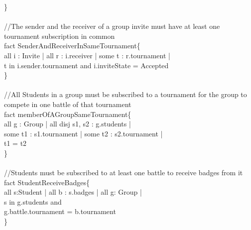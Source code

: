 \documentclass{article}
\begin{document}
{\}\\
\\
\color{gray}
//The sender and the receiver of a group invite must have at least one tournament subscription in common\\
\color{black}
\color{blue} fact \color{black} SenderAndReceiverInSameTournament\{\\
\-\hspace{1cm} \color{blue} all \color{black} i : Invite | \color{blue} all \color{black} r : i.receiver |  \color{blue} some \color{black} t : r.tournament | \\
\-\hspace{1cm} t \color{blue} in \color{black} i.sender.tournament \color{blue} and \color{black} i.inviteState = Accepted \\
\}\\
\\
\color{gray}
//All Students in a group must be subscribed to a tournament for the group to compete in one battle of that tournament\\%
\color{black}
\color{blue} fact \color{black} memberOfAGroupSameTournament\{\\
\-\hspace{1cm} \color{blue} all \color{black} g : Group | \color{blue} all disj \color{black} s1, s2 : g.students | \\
\-\hspace{1cm} \color{blue} some \color{black} t1 : s1.tournament | \color{blue} some \color{black} t2 : s2.tournament | \\
\-\hspace{1cm} t1 \color{blue} = \color{black} t2\\
\}\\
\\
\color{gray}
//Students must be subscribed to at least one battle to receive badges from it\\
\color{black}
\color{blue} fact \color{black} StudentReceiveBadges\{\\
\-\hspace{1cm} \color{blue} all \color{black} s:Student | \color{blue} all \color{black} b : s.badges | \color{blue} all \color{black} g: Group |  \\
\-\hspace{1cm} s \color{blue} in \color{black} g.students and    \\
\-\hspace{1cm} g.battle.tournament \color{blue} = \color{black} b.tournament\\
\}\\

}
\end{document}
